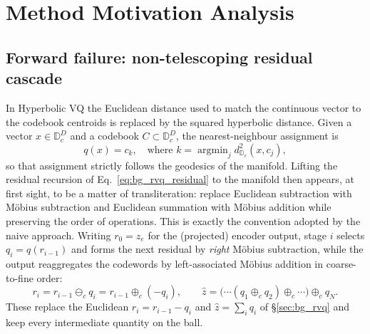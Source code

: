 \documentclass[12pt]{report}
\begin{document}
\appendix
\chapter{Method Motivation Analysis}
\section{Forward failure: non-telescoping residual cascade}
\label{sec:hrq}
In Hyperbolic VQ the Euclidean distance used to match the continuous vector to the codebook centroids is replaced by the squared hyperbolic distance. Given a vector $x \in \mathbb{D}_c^D$ and a codebook $C \subset \mathbb{D}_c^D$, the nearest-neighbour assignment is
\begin{equation}
    q(x) = c_k, \quad \text{where } k = \operatorname{argmin}_j d_{\mathbb{D}_c}^2(x, c_j),
\end{equation}
so that assignment strictly follows the geodesics of the manifold. Lifting the residual recursion of Eq.~\ref{eq:bg_rvq_residual} to the manifold then appears, at first sight, to be a matter of transliteration: replace Euclidean subtraction with M\"obius subtraction and Euclidean summation with M\"obius addition while preserving the order of operations. This is exactly the convention adopted by the naive approach. Writing $r_0 = z_e$ for the (projected) encoder output, stage $i$ selects $q_i = q(r_{i-1})$ and forms the next residual by \emph{right} M\"obius subtraction, while the output reaggregates the codewords by left-associated M\"obius addition in coarse-to-fine order:
\begin{equation}
    \label{eq:prev_residual}
    r_i = r_{i-1}\ominus_c q_i = r_{i-1}\oplus_c(-q_i),
    \qquad
    \hat z = \big(\cdots(q_1\oplus_c q_2)\oplus_c\cdots\big)\oplus_c q_{N} .
\end{equation}
These replace the Euclidean $r_i = r_{i-1}-q_i$ and $\hat z=\sum_i q_i$ of \S\ref{sec:bg_rvq} and keep every intermediate quantity on the ball.
\end{document}
